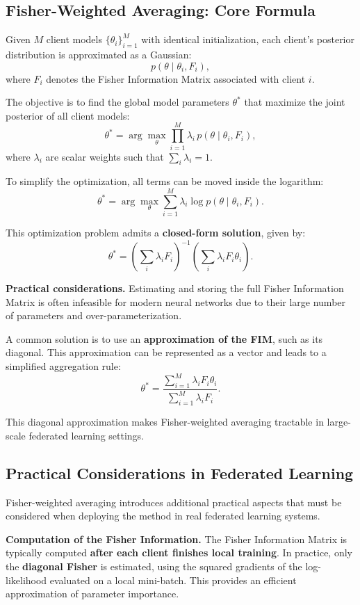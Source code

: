 \subsection{Fisher-Weighted Averaging: Core Formula}

Given $M$ client models $\{\theta_i\}_{i=1}^{M}$ with identical initialization, each client’s
posterior distribution is approximated as a Gaussian:
\[
p(\theta \mid \theta_i, F_i),
\]
where $F_i$ denotes the Fisher Information Matrix associated with client $i$.

The objective is to find the global model parameters $\theta^*$ that maximize the joint
posterior of all client models:
\[
\theta^*
=
\arg\max_{\theta}
\prod_{i=1}^{M}
\lambda_i \,
p(\theta \mid \theta_i, F_i),
\]
where $\lambda_i$ are scalar weights such that $\sum_i \lambda_i = 1$.

To simplify the optimization, all terms can be moved inside the logarithm:
\[
\theta^*
=
\arg\max_{\theta}
\sum_{i=1}^{M}
\lambda_i
\log p(\theta \mid \theta_i, F_i).
\]

This optimization problem admits a \textbf{closed-form solution}, given by:
\[
\theta^*
=
\left(
\sum_{i}
\lambda_i F_i
\right)^{-1}
\left(
\sum_{i}
\lambda_i F_i \theta_i
\right).
\]

\textbf{Practical considerations.}  
Estimating and storing the full Fisher Information Matrix is often infeasible for modern
neural networks due to their large number of parameters and over-parameterization.

A common solution is to use an \textbf{approximation of the FIM}, such as its diagonal. This
approximation can be represented as a vector and leads to a simplified aggregation rule:
\[
\theta^*
=
\frac{
\sum_{i=1}^{M}
\lambda_i F_i \theta_i
}{
\sum_{i=1}^{M}
\lambda_i F_i
}.
\]

This diagonal approximation makes Fisher-weighted averaging tractable in large-scale
federated learning settings.

\subsection{Practical Considerations in Federated Learning}

Fisher-weighted averaging introduces additional practical aspects that must be considered
when deploying the method in real federated learning systems.

\textbf{Computation of the Fisher Information.}  
The Fisher Information Matrix is typically computed \textbf{after each client finishes
local training}. In practice, only the \textbf{diagonal Fisher} is estimated, using the
squared gradients of the log-likelihood evaluated on a local mini-batch. This provides an
efficient approximation of parameter importance.

